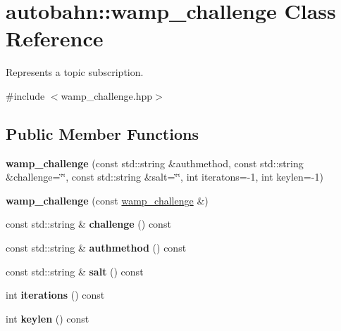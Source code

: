 \hypertarget{classautobahn_1_1wamp__challenge}{}\section{autobahn\+:\+:wamp\+\_\+challenge Class Reference}
\label{classautobahn_1_1wamp__challenge}


Represents a topic subscription.  




{\ttfamily \#include $<$wamp\+\_\+challenge.\+hpp$>$}

\subsection*{Public Member Functions}
\begin{DoxyCompactItemize}
\item 
{\bfseries wamp\+\_\+challenge} (const std\+::string \&authmethod, const std\+::string \&challenge=\char`\"{}\char`\"{}, const std\+::string \&salt=\char`\"{}\char`\"{}, int iteratons=-\/1, int keylen=-\/1)\hypertarget{classautobahn_1_1wamp__challenge_adb8c2a047fdf0ac2d0329be9d83aac69}{}\label{classautobahn_1_1wamp__challenge_adb8c2a047fdf0ac2d0329be9d83aac69}

\item 
{\bfseries wamp\+\_\+challenge} (const \hyperlink{classautobahn_1_1wamp__challenge}{wamp\+\_\+challenge} \&)\hypertarget{classautobahn_1_1wamp__challenge_a63fff6f796f929e45c53e3b97fc1c1af}{}\label{classautobahn_1_1wamp__challenge_a63fff6f796f929e45c53e3b97fc1c1af}

\item 
const std\+::string \& {\bfseries challenge} () const \hypertarget{classautobahn_1_1wamp__challenge_af455935d964f1e8a0653a22c15b203b5}{}\label{classautobahn_1_1wamp__challenge_af455935d964f1e8a0653a22c15b203b5}

\item 
const std\+::string \& {\bfseries authmethod} () const \hypertarget{classautobahn_1_1wamp__challenge_a908e01a12b7ac213b6068e77eebde7f4}{}\label{classautobahn_1_1wamp__challenge_a908e01a12b7ac213b6068e77eebde7f4}

\item 
const std\+::string \& {\bfseries salt} () const \hypertarget{classautobahn_1_1wamp__challenge_a57bb808bce0c17a2d931784d2d72c899}{}\label{classautobahn_1_1wamp__challenge_a57bb808bce0c17a2d931784d2d72c899}

\item 
int {\bfseries iterations} () const \hypertarget{classautobahn_1_1wamp__challenge_abe012a849e0be7c51f11198b7aa7dbe0}{}\label{classautobahn_1_1wamp__challenge_abe012a849e0be7c51f11198b7aa7dbe0}

\item 
int {\bfseries keylen} () const \hypertarget{classautobahn_1_1wamp__challenge_a9d2bbd4d04b83e33a0cbe2ea37ab8702}{}\label{classautobahn_1_1wamp__challenge_a9d2bbd4d04b83e33a0cbe2ea37ab8702}

\end{DoxyCompactItemize}


